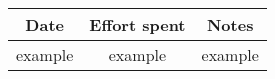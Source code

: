 \documentclass[../../main.tex]{subfiles}
\begin{document}
\begin{center}
    \begin{tabular}{|c| |c| |c|} 
        \hline
        Date & Effort spent & Notes\\ [0.5ex] 
        \hline\hline
        example & example & example\\ 
        \hline
    \end{tabular}
\end{center}
\end{document}
